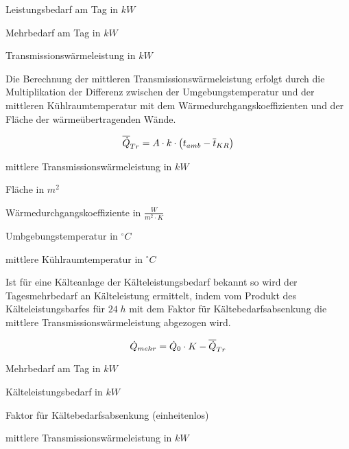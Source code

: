 \begin{description}[\dth]

	\item[$\ptag$] Leistungsbedarf am Tag in $kW$
	\item[$\pmehr$] Mehrbedarf am Tag in $kW$
	\item[$\ptrans$] Transmissionswärmeleistung in $kW$

\end{description}
\vspace{0.5cm}

Die Berechnung der mittleren Transmissionswärmeleistung erfolgt durch die
Multiplikation der Differenz zwischen der Umgebungstemperatur und der mittleren
Kühlraumtemperatur mit dem Wärmedurchgangskoeffizienten und der Fläche der
wärmeübertragenden Wände.

\begin{equation}
	\aptrans = A \cdot k \cdot \left( t_{amb} -
	\overline{t}_{KR} \right) \label{aptrans}
\end{equation}

\begin{description}[\dth]

	\item[$\aptrans$] mittlere Transmissionswärmeleistung in $kW$
	\item[$A$] Fläche in $m^2$
	\item[$k$] Wärmedurchgangskoeffiziente in $\frac{W}{m^2 \cdot K}$
	\item[$t_{amb}$] Umbgebungstemperatur in $^{\circ}C$
	\item[$\overline{t}_{KR}$] mittlere Kühlraumtemperatur in
		$^{\circ}C$
\end{description}
\vspace{0.5cm}

Ist f\"ur eine K\"alteanlage der K\"alteleistungsbedarf bekannt so wird der
Tagesmehrbedarf an K\"alteleistung ermittelt, indem vom Produkt des
K\"alteleistungsbarfes f\"ur $24\;h$ mit dem Faktor f\"ur
K\"altebedarfsabsenkung die mittlere Transmissionswärmeleistung abgezogen wird.

\begin{equation}
	\pmehr = \pkalt \cdot K - \aptrans
\label{pmehr}
\end{equation}

\begin{description}[\dth]

	\item[$\pmehr$] Mehrbedarf am Tag in $kW$
	\item[$\pkalt$] Kälteleistungsbedarf in $kW$
	\item[$K$] Faktor für Kältebedarfsabsenkung (einheitenlos)
	\item[$\aptrans$] mittlere Transmissionswärmeleistung in $kW$

\end{description}
\vspace{0.5cm}


